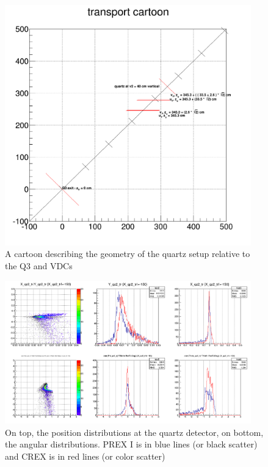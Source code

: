 \documentclass[11pt]{amsart}
\begin{document}
\FloatBarrier
\begin{figure}
\includegraphics[width=0.95\textwidth]{plots/transportcartoon.png}
\caption{A cartoon describing the geometry of the quartz setup relative to the Q3 and VDCs}
\end{figure}

\begin{figure}
\includegraphics[width=0.95\textwidth]{plots/crex_footprint.png}
\caption{On top, the position distributions at the quartz detector, on bottom, the angular distributions. PREX I is in blue lines (or black scatter) and CREX is in red lines (or color scatter)}
\end{figure}

\FloatBarrier
\end{document}

